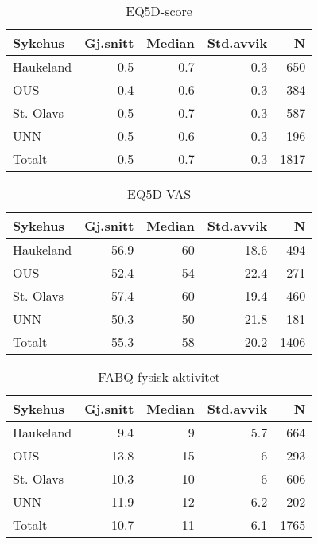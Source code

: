 \documentclass[norsk,a4paper]{article}\usepackage[]{graphicx}\usepackage[]{color}
\begin{document}
\begin{table}[ht]
\centering
\begin{tabular}{lrrrr}
  \hline
Sykehus & Gj.snitt & Median & Std.avvik & N \\ 
  \hline
Haukeland & 0.5 & 0.7 & 0.3 & 650 \\ 
  OUS & 0.4 & 0.6 & 0.3 & 384 \\ 
  St. Olavs & 0.5 & 0.7 & 0.3 & 587 \\ 
  UNN & 0.5 & 0.6 & 0.3 & 196 \\ 
  Totalt & 0.5 & 0.7 & 0.3 & 1817 \\ 
   \hline
\end{tabular}
\caption{EQ5D-score} 
\end{table}
\begin{table}[ht]
\centering
\begin{tabular}{lrrrr}
  \hline
Sykehus & Gj.snitt & Median & Std.avvik & N \\ 
  \hline
Haukeland & 56.9 & 60 & 18.6 & 494 \\ 
  OUS & 52.4 & 54 & 22.4 & 271 \\ 
  St. Olavs & 57.4 & 60 & 19.4 & 460 \\ 
  UNN & 50.3 & 50 & 21.8 & 181 \\ 
  Totalt & 55.3 & 58 & 20.2 & 1406 \\ 
   \hline
\end{tabular}
\caption{EQ5D-VAS} 
\end{table}
\begin{table}[ht]
\centering
\begin{tabular}{lrrrr}
  \hline
Sykehus & Gj.snitt & Median & Std.avvik & N \\ 
  \hline
Haukeland & 9.4 & 9 & 5.7 & 664 \\ 
  OUS & 13.8 & 15 & 6 & 293 \\ 
  St. Olavs & 10.3 & 10 & 6 & 606 \\ 
  UNN & 11.9 & 12 & 6.2 & 202 \\ 
  Totalt & 10.7 & 11 & 6.1 & 1765 \\ 
   \hline
\end{tabular}
\caption{FABQ fysisk aktivitet} 
\end{table}
\end{document}
